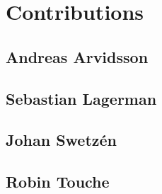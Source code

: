 \section*{Contributions}
\subsection*{Andreas Arvidsson}
\subsection*{Sebastian Lagerman}
\subsection*{Johan Swetzén}
\subsection*{Robin Touche}
